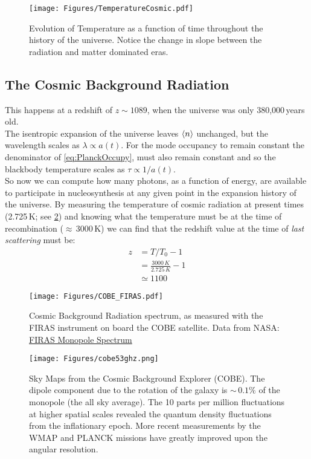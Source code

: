 \begin{figure}[h]
\centering
\texttt{[image: Figures/TemperatureCosmic.pdf]}
\caption{Evolution of Temperature as a function of time throughout the history of the universe.
Notice the change in slope between the radiation and matter dominated eras.}
\label{fig:TempVsTime}
\end{figure}



\subsection{The Cosmic Background Radiation}
\label{sec:CBR}
This happens at a redshift of $z \sim 1089$, when the universe was only 380,000\,years old.\\

The isentropic expansion of the universe leaves $\Braket{n}$ unchanged, but the wavelength scales as $\lambda \propto a(t)$. For the mode occupancy to remain constant the denominator of \cref{eq:PlanckOccupy}, must also remain constant and so the blackbody temperature scales as $\tau \propto 1/a(t)$. \\


So now we can compute how many photons, as a function of energy, are available to participate in nucleosynthesis at any given point in the expansion history of the universe. By measuring the temperature of cosmic radiation at present times (2.725\,K; see \cref{fig:FIRAS}) and knowing what the temperature must be at the time of recombination ($\approx$\,3000\,K) we can find that the redshift value at the time of \textit{last scattering} must be:
\begin{align}
z &= T/T_0 - 1 \\
  &= \frac{3000\,K}{2.725\,K} - 1 \\
  &\simeq 1100
\end{align}

\begin{figure}[!h]
\centering
\texttt{[image: Figures/COBE\_FIRAS.pdf]}
\caption{Cosmic Background Radiation spectrum, as measured with the FIRAS instrument on board the COBE satellite. Data from NASA: \href{http://lambda.gsfc.nasa.gov/product/cobe/firas_prod_table.cfm}{FIRAS Monopole Spectrum}}
\label{fig:FIRAS}
\end{figure}

\begin{figure}[!h]
\centering
\texttt{[image: Figures/cobe53ghz.png]}
\caption{Sky Maps from the Cosmic Background Explorer (COBE). The dipole component due to the rotation of the galaxy is $\sim\,0.1\%$ of the monopole (the all sky average). The 10 parts per
million fluctuations at higher spatial scales revealed the quantum density fluctuations from the
inflationary epoch. More recent measurements by the WMAP and PLANCK missions have greatly improved
upon the angular resolution.}
\label{fig:COBEsky}
\end{figure}

